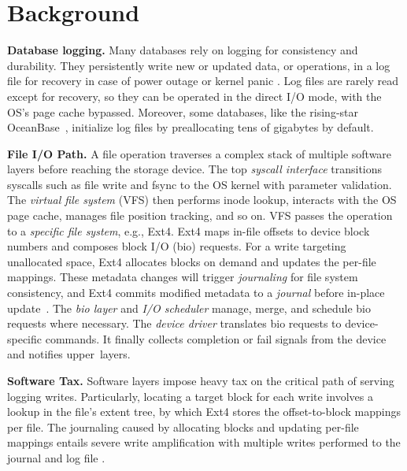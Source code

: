 \section{Background}\label{sec:background}

{\bf  Database logging.}
Many databases rely on logging for consistency and durability.
They  persistently write  new or updated data, or operations, in a log file  for recovery in case of power outage or kernel panic
\cite{DB:OceanBase:VLDB-2022,lee2015waldio,mysql2013mysql}.
Log files are rarely read except for recovery, so they can be operated in the direct I/O mode, with the OS's page cache bypassed.
 Moreover, some databases, like the rising-star OceanBase~\cite{DB:OceanBase:VLDB-2022},
   initialize
  log files by preallocating tens of gigabytes by default. 

\textbf{File I/O Path.}
A file operation
traverses a complex  stack   of multiple software layers 
before reaching the storage device.
The top    {\em syscall interface}
  transitions syscalls such as file write and fsync to the OS kernel  with parameter validation.
The {\em virtual file system} ({VFS}) then performs inode lookup, interacts with the OS page cache, 
manages file position tracking, and so on.%
VFS passes the  operation to
a {\em specific file system}, e.g.,
Ext4.
Ext4
maps   in-file offsets to device block numbers and   composes block I/O (bio) requests.
For a write targeting unallocated space, Ext4 allocates   blocks on demand
and updates the per-file mappings. These metadata changes will trigger
{\em journaling} for file system consistency, and Ext4 commits modified metadata
to a  {\em journal}
before in-place update~\cite{fsync:FastCommit:ATC-2024,fsync:iJournaling:ATC-2017}.
The {\em bio layer} and {\em I/O scheduler}  manage, merge, and schedule bio requests where necessary. 
The {\em device driver} translates bio requests to device-specific commands. It finally collects completion or fail signals from the device and
notifies upper~layers.

\textbf{Software Tax.}	
Software layers impose heavy tax on the critical path of serving  logging writes.
Particularly, locating a target block for each write involves a lookup
in the file's extent tree, by which Ext4 stores the offset-to-block mappings per file. 
The journaling caused by allocating blocks and updating  per-file mappings 
entails severe write amplification with multiple writes performed to  the journal and log file \cite{fsync:iJournaling:ATC-2017,fsync:FastCommit:ATC-2024}.

